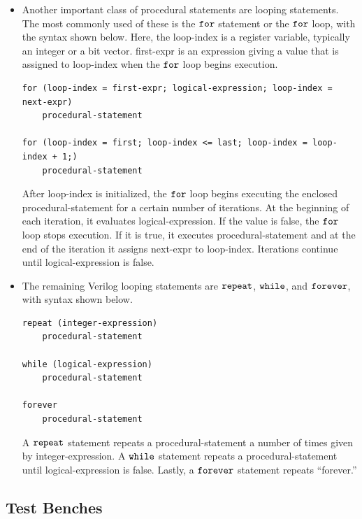 \documentclass[10pt,a4paper]{article}
\begin{document}
\begin{itemize}
\item Another important class of procedural statements are looping statements. The most commonly used of these is the $\tt{for}$ statement or the $\tt{for}$ loop, with the syntax shown below. Here, the loop-index is a register variable, typically an integer or a bit vector. first-expr is an expression giving a value that is assigned to loop-index when the $\tt{for}$ loop begins execution.
\begin{lstlisting}
for (loop-index = first-expr; logical-expression; loop-index = next-expr)
	procedural-statement

for (loop-index = first; loop-index <= last; loop-index = loop-index + 1;)
	procedural-statement
\end{lstlisting}
After loop-index is initialized, the $\tt{for}$ loop begins executing the enclosed procedural-statement for a certain number of iterations. At the beginning of each iteration, it evaluates logical-expression. If the value is false, the $\tt{for}$ loop stops execution. If it is true, it executes procedural-statement and at the end of the iteration it assigns next-expr to loop-index. Iterations continue until logical-expression is false.
\item The remaining Verilog looping statements are $\tt{repeat}$, $\tt{while}$, and $\tt{forever}$, with syntax shown below.
\begin{lstlisting}
repeat (integer-expression)
	procedural-statement

while (logical-expression)
	procedural-statement

forever
	procedural-statement
\end{lstlisting}
A $\tt{repeat}$ statement repeats a procedural-statement a number of times given by integer-expression. A $\tt{while}$ statement repeats a procedural-statement until logical-expression is false. Lastly, a $\tt{forever}$ statement repeats ``forever.''
\end{itemize}
\subsection{Test Benches}
\end{document}
